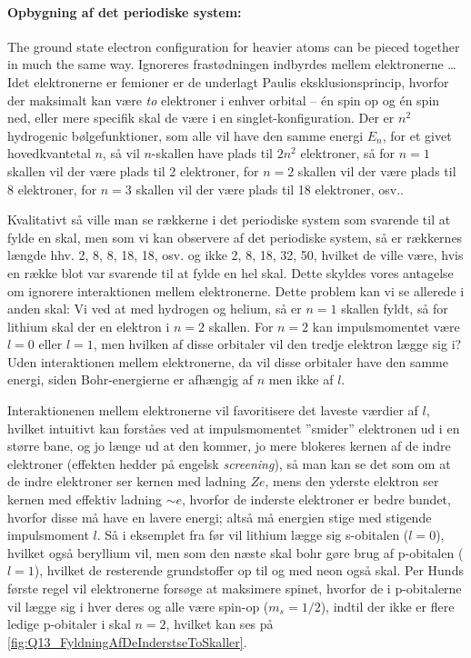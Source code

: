 \paragraph{Opbygning af det periodiske system:} The ground state electron configuration for heavier atoms can be pieced together in much the same way. Ignoreres frastødningen indbyrdes mellem elektronerne \ldots
\noindent
Idet elektronerne er femioner er de underlagt Paulis eksklusionsprincip, hvorfor der maksimalt kan være \emph{to} elektroner i enhver orbital -- én spin op og én spin ned, eller mere specifik skal de være i en singlet-konfiguration. Der er $n^2$ hydrogenic bølgefunktioner, som alle vil have den samme energi $E_n$, for et givet hovedkvantetal $n$, så vil $n$-skallen have plads til $2n^2$ elektroner, så for $n=1$ skallen vil der være plads til 2 elektroner, for $n=2$ skallen vil der være plads til 8 elektroner, for $n=3$ skallen vil der være plads til 18 elektroner, osv..

Kvalitativt så ville man se rækkerne i det periodiske system som svarende til at fylde en skal, men som vi kan observere af det periodiske system, så er rækkernes længde hhv. 2, 8, 8, 18, 18, osv. og ikke 2, 8, 18, 32, 50, hvilket de ville være, hvis en række blot var svarende til at fylde en hel skal. Dette skyldes vores antagelse om ignorere interaktionen mellem elektronerne. Dette problem kan vi se allerede i anden skal: Vi ved at med hydrogen og helium, så er $n=1$ skallen fyldt, så for lithium skal der en elektron i $n=2$ skallen. For $n=2$ kan impulsmomentet være $l=0$ eller $l=1$, men hvilken af disse orbitaler vil den tredje elektron lægge sig i? Uden interaktionen mellem elektronerne, da vil disse orbitaler have den samme energi, siden Bohr-energierne er afhængig af $n$ men ikke af $l$.

Interaktionenen mellem elektronerne vil favoritisere det laveste værdier af $l$, hvilket intuitivt kan forståes ved at impulsmomentet ''smider'' elektronen ud i en større bane, og jo længe ud at den kommer, jo mere blokeres kernen af de indre elektroner (effekten hedder på engelsk \emph{screening}), så man kan se det som om at de indre elektroner ser kernen med ladning $Ze$, mens den yderste elektron ser kernen med effektiv ladning $\sim e$, hvorfor de inderste elektroner er bedre bundet, hvorfor disse må have en lavere energi; altså må energien stige med stigende impulsmoment $l$. Så i eksemplet fra før vil lithium lægge sig s-obitalen ($l=0$), hvilket også beryllium vil, men som den næste skal bohr gøre brug af p-obitalen ($l=1$), hvilket de resterende grundstoffer op til og med neon også skal. Per Hunds første regel vil elektronerne forsøge at maksimere spinet, hvorfor de i p-obitalerne vil lægge sig i hver deres og alle være spin-op ($m_s = 1/2$), indtil der ikke er flere ledige p-obitaler i skal $n=2$, hvilket kan ses på \cref{fig:Q13_FyldningAfDeInderstseToSkaller}.


